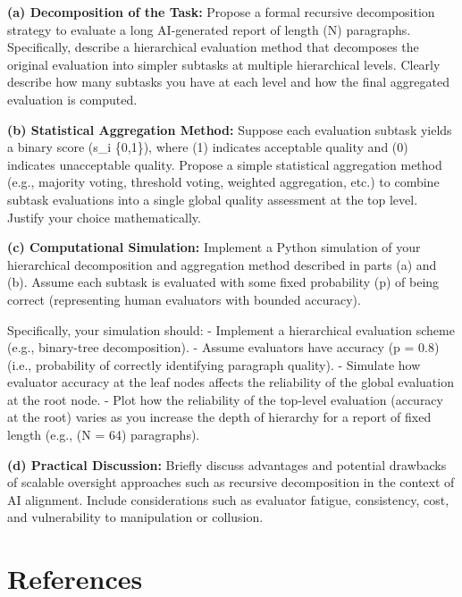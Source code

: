 \documentclass[
  letterpaper,
  numbers=noenddot,
  DIV=11]{scrreprt}
\theoremstyle{plain}
\theoremstyle{definition}
\theoremstyle{remark}
\begin{document}
\textbf{(a) Decomposition of the Task:} Propose a formal recursive
decomposition strategy to evaluate a long AI-generated report of length
(N) paragraphs. Specifically, describe a hierarchical evaluation method
that decomposes the original evaluation into simpler subtasks at
multiple hierarchical levels. Clearly describe how many subtasks you
have at each level and how the final aggregated evaluation is computed.

\textbf{(b) Statistical Aggregation Method:} Suppose each evaluation
subtask yields a binary score (s\_i \in \{0,1\}), where (1) indicates
acceptable quality and (0) indicates unacceptable quality. Propose a
simple statistical aggregation method (e.g., majority voting, threshold
voting, weighted aggregation, etc.) to combine subtask evaluations into
a single global quality assessment at the top level. Justify your choice
mathematically.

\textbf{(c) Computational Simulation:} Implement a Python simulation of
your hierarchical decomposition and aggregation method described in
parts (a) and (b). Assume each subtask is evaluated with some fixed
probability (p) of being correct (representing human evaluators with
bounded accuracy).

Specifically, your simulation should: - Implement a hierarchical
evaluation scheme (e.g., binary-tree decomposition). - Assume evaluators
have accuracy (p = 0.8) (i.e., probability of correctly identifying
paragraph quality). - Simulate how evaluator accuracy at the leaf nodes
affects the reliability of the global evaluation at the root node. -
Plot how the reliability of the top-level evaluation (accuracy at the
root) varies as you increase the depth of hierarchy for a report of
fixed length (e.g., (N = 64) paragraphs).

\textbf{(d) Practical Discussion:} Briefly discuss advantages and
potential drawbacks of scalable oversight approaches such as recursive
decomposition in the context of AI alignment. Include considerations
such as evaluator fatigue, consistency, cost, and vulnerability to
manipulation or collusion.

\section*{References}\label{bibliography-5}

\end{document}
